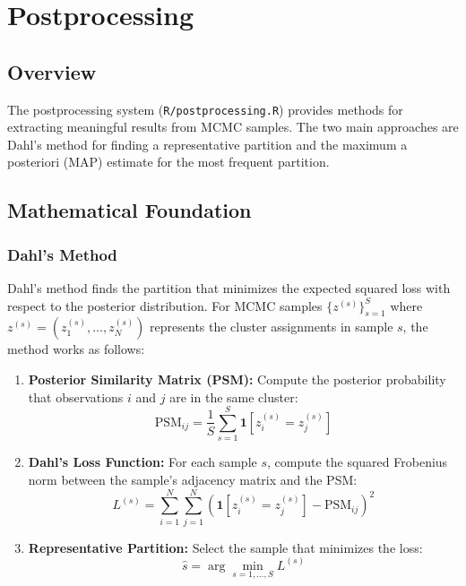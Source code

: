 \documentclass[11pt]{article}
\begin{document}
\section{Postprocessing}

\subsection{Overview}

The postprocessing system (\texttt{R/postprocessing.R}) provides methods for extracting meaningful results from MCMC samples. The two main approaches are Dahl's method for finding a representative partition and the maximum a posteriori (MAP) estimate for the most frequent partition.

\subsection{Mathematical Foundation}

\subsubsection{Dahl's Method}

Dahl's method finds the partition that minimizes the expected squared loss with respect to the posterior distribution. For MCMC samples $\{z^{(s)}\}_{s=1}^S$ where $z^{(s)} = (z_1^{(s)}, \ldots, z_N^{(s)})$ represents the cluster assignments in sample $s$, the method works as follows:

\begin{enumerate}
\item \textbf{Posterior Similarity Matrix (PSM):} Compute the posterior probability that observations $i$ and $j$ are in the same cluster:
\begin{equation}
\text{PSM}_{ij} = \frac{1}{S} \sum_{s=1}^S \mathbf{1}[z_i^{(s)} = z_j^{(s)}]
\end{equation}

\item \textbf{Dahl's Loss Function:} For each sample $s$, compute the squared Frobenius norm between the sample's adjacency matrix and the PSM:
\begin{equation}
L^{(s)} = \sum_{i=1}^N \sum_{j=1}^N \left( \mathbf{1}[z_i^{(s)} = z_j^{(s)}] - \text{PSM}_{ij} \right)^2
\end{equation}

\item \textbf{Representative Partition:} Select the sample that minimizes the loss:
\begin{equation}
\hat{s} = \arg\min_{s=1,\ldots,S} L^{(s)}
\end{equation}
\end{enumerate}
\end{document}
